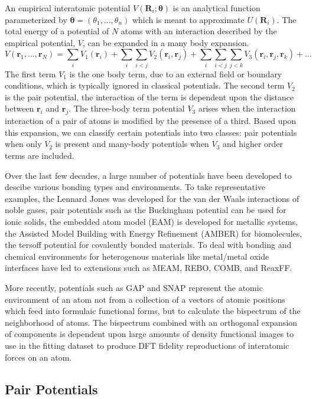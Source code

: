 An empirical interatomic potential $V(\bm{R}_i;\bm{\theta})$ is an analytical function parameterized by $\bm{\theta}=(\theta_1,...,\theta_n)$ which is meant to approximate $U(\bm{R}_i)$.  The total energy of a potential of $N$ atoms with an interaction described by the empirical potential, $V$, can be expanded in a many body expansion.
\begin{equation}
	V(\bm{r}_1,...,\bm{r}_N)= \sum_i V_1(\bm{r}_i)
	                          + \sum_i \sum_{i<j} V_2(\bm{r}_i,\bm{r}_j)
				  + \sum_i \sum_{i<j} \sum_{j<k} V_3(\bm{r}_i,\bm{r}_j,\bm{r}_k) + ...
\end{equation}
The first term $V_1$ is the one body term, due to an external field or boundary conditions, which is typically ignored in classical potentials.  The second term $V_2$ is the pair potential, the interaction of the term is dependent upon the distance between $\bm{r}_i$ and $\bm{r}_j$.  The three-body term potential $V_3$ arises when the interaction interaction of a pair of atoms is modified by the presence of a third.  Based upon this expansion, we can classify certain potentials into two classes: pair potentials when only $V_2$ is present and many-body potentials when $V_3$ and higher order terms are included.

Over the last few decades, a large number of potentials have been developed to descibe various bonding types and environments.  To take representative examples, the Lennard Jones was developed for the van der Waals interactions of noble gases, pair potentials such as the Buckingham potential can be used for ionic solids, the embedded atom model (EAM) is developed for metallic systems, the Assisted Model Building with Energy Refinement (AMBER) for biomolecules, the tersoff potential for covalently bonded materials.  To deal with bonding and chemical environments for heterogenous materials like metal/metal oxide interfaces have led to extensions such as MEAM, REBO, COMB, and ReaxFF.

More recently, potentials such as GAP and SNAP represent the atomic environment of an atom not from a collection of a vectors of atomic positions which feed into formulaic functional forms, but to calculate the bispectrum of the neighborhood of atoms.  The bispectrum combined with an orthogonal expansion of components is dependent upon large amounts of density functional images to use in the fitting dataset to produce DFT fidelity reproductions of interatomic forces on an atom.
\subsection{Pair Potentials}
